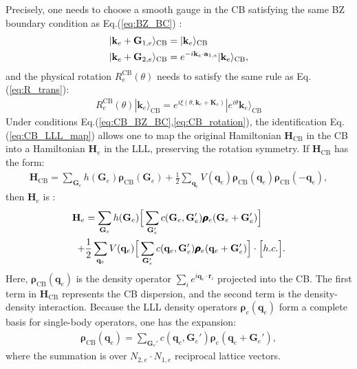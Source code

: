 Precisely, one needs to choose a smooth gauge in the CB satisfying the same BZ boundary condition as Eq.(\ref{eq:BZ_BC}) \cite{jian2013crystal}:
\begin{align}
    |\mathbf k_e+\mathbf G_{1,e}\rangle_{\text{CB}} & =|\mathbf k_e\rangle_{\text{CB}}\notag                                                     \\
    |\mathbf k_e+\mathbf G_{2,e}\rangle_{\text{CB}} & =e^{-i \mathbf k_e\cdot\mathbf a_{1,e}}|\mathbf k_e\rangle_{\text{CB}},\label{eq:CB_BZ_BC}
\end{align}
and the physical rotation $R^{\text{CB}}_e(\theta)$ needs to satisfy the same rule as Eq.(\ref{eq:R_trans}):
\begin{align}
    R^{\text{CB}}_e(\theta)|\mathbf k_e\rangle_{\text{CB}}=e^{i \xi(\theta,\mathbf k_e+\mathbf K_e)}|e^{i\theta}\mathbf k_e\rangle_{\text{CB}}\label{eq:CB_rotation}
\end{align}
Under conditions Eq.(\ref{eq:CB_BZ_BC},\ref{eq:CB_rotation}), the identification Eq.(\ref{eq:CB_LLL_map}) allows one to map the original Hamiltonian $\mathbf H_{\text{CB}}$ in the CB into a Hamiltonian $\mathbf H_e$ in the LLL, preserving the rotation symmetry. If $\mathbf H_{\text{CB}}$ has the form:
\begin{align}
    \mathbf H_{\text{CB}}=\sum_{\mathbf G_e} h(\mathbf G_e) \pmb{\boldsymbol\rho}_{\text{CB}}(\mathbf G_e)+\frac{1}{2}\sum_{\mathbf q_e} V(\mathbf q_e)\pmb{\boldsymbol\rho}_{\text{CB}}(\mathbf q_e)\pmb{\boldsymbol\rho}_{\text{CB}}(-\mathbf q_e),\label{eq:CB_H_e}
\end{align}
then $\mathbf H_e$ is \cite{murthy2012hamiltonian}:
\begin{align}
    \mathbf H_e & =\sum_{\mathbf G_e} h(\mathbf G_e) \Big[\sum_{\mathbf G_e'}c(\mathbf G_e,\mathbf G_e')\pmb{\boldsymbol\rho}_{e}(\mathbf G_e+\mathbf G_e')\Big]\notag                                      \\
    +           & \frac{1}{2}\sum_{\mathbf q_e} V(\mathbf q_e)\Big[\sum_{\mathbf G_e'}c(\mathbf q_e,\mathbf G_e')\pmb{\boldsymbol\rho}_{e}(\mathbf q_e+\mathbf G_e')\Big]\cdot\Big[h.c.\Big].\label{eq:H_e}
\end{align}
Here, $\pmb{\boldsymbol\rho}_{\text{CB}}(\mathbf q_e)$ is the density operator $\sum_i e^{i\mathbf q_e\cdot \bm{r}_i}$ projected into the CB. The first term in $\mathbf H_{\text{CB}}$ represents the CB dispersion, and the second term is the density-density interaction. Because the LLL density operators $\pmb{\boldsymbol\rho}_e(\mathbf q_e)$ form a complete basis for single-body operators, one has the expansion:
\begin{align}
    \pmb{\boldsymbol\rho}_{\text{CB}}(\mathbf q_e)=\sum_{\mathbf G_e'}c(\mathbf q_e,\mathbf G_e')\pmb{\boldsymbol\rho}_{e}(\mathbf q_e+\mathbf G_e'),\label{eq:rho_CB}
\end{align}
where the summation is over $N_{2,e}\cdot N_{1,e}$ reciprocal lattice vectors.

